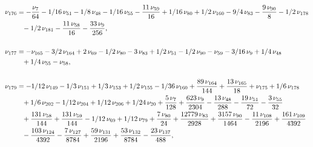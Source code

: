 \documentclass[a4paper,12pt, DIV=14, BCOR=5mm, twoside, headsepline, numbers=noenddot]{scrbook}
\begin{document}
\begin{align}
\begin{aligned}
\nu_{{176}}&=-{\frac {\nu_{{7}}}{64}}-1/16\,\nu_{{51
}}-1/8\,\nu_{{48}}-1/16\,\nu_{{55}}-{\frac {11\,\nu_{{59}}}{16}}+1/16
\,\nu_{{80}}+1/2\,\nu_{{160}}-9/4\,\nu_{{83}}-{\frac {9\,\nu_{{90}}}{8
}}-1/2\,\nu_{{178}}\\
 &\hphantom{=}-1/2\,\nu_{{181}}-{\frac {11\,\nu_{{58}}}{16}}-{
\frac {33\,\nu_{{9}}}{256}}, \\
\\
\nu_{{177}}&=-\nu_{{165}}-3/2\,\nu_{{164}}+
2\,\nu_{{69}}-1/2\,\nu_{{80}}-3\,\nu_{{83}}+1/2\,\nu_{{51}}-1/2\,\nu_{
{90}}-\nu_{{59}}-3/16\,\nu_{{9}}+1/4\,\nu_{{48}}\\
 &\hphantom{=}+1/4\,\nu_{{55}}-\nu_{
{58}}, \\
\\
\nu_{{179}}&=-1/12\,\nu_{{149}}-1/3\,\nu_{{151}}+1/3\,\nu_{{153}}
+1/2\,\nu_{{155}}-1/36\,\nu_{{160}}+{\frac {89\,\nu_{{164}}}{144}}+{
\frac {13\,\nu_{{165}}}{18}}+\nu_{{175}}+1/6\,\nu_{{178}}\\
 &\hphantom{=}+1/6\,\nu_{{
202}}-1/12\,\nu_{{204}}+1/12\,\nu_{{206}}+1/24\,\nu_{{20}}+{\frac {5\,
\nu_{{7}}}{128}}+{\frac {623\,\nu_{{9}}}{2304}}-{\frac {13\,\nu_{{48}}
}{288}}-{\frac {19\,\nu_{{51}}}{72}}-{\frac {3\,\nu_{{55}}}{32}}\\
 &\hphantom{=}+{
\frac {131\,\nu_{{58}}}{144}}+{\frac {131\,\nu_{{59}}}{144}}-1/12\,\nu
_{{69}}+1/12\,\nu_{{79}}+{\frac {7\,\nu_{{80}}}{24}}+{\frac {12779\,
\nu_{{83}}}{2928}}+{\frac {3157\,\nu_{{90}}}{1464}}-{\frac {11\,\nu_{{
108}}}{2196}}+{\frac {161\,\nu_{{109}}}{4392}}\\
 &\hphantom{=}-{\frac {103\,\nu_{{124}
}}{4392}}-{\frac {7\,\nu_{{127}}}{8784}}+{\frac {59\,\nu_{{131}}}{2196
}}+{\frac {53\,\nu_{{132}}}{8784}}-{\frac {23\,\nu_{{137}}}{488}}, 
\end{aligned}
\end{align}
\end{document}

